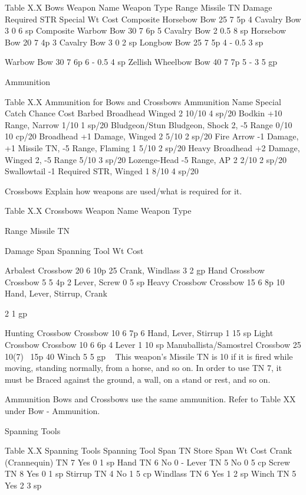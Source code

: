 \documentclass[oneside,11pt,english]{book}
\begin{document}
 
Table X.X Bows 
Weapon Name Weapon Type Range Missile TN Damage Required STR Special Wt Cost 
Composite Horsebow Bow 25 7 5p 4 Cavalry Bow 3 0 6 sp 
Composite Warbow Bow 30 7 6p 5 Cavalry Bow 2 0.5 8 sp 
Horsebow Bow 20 7 4p 3 Cavalry Bow 3 0 2 sp 
Longbow Bow 25 7 5p 4 - 0.5 3 sp 


Warbow Bow 30 7 6p 6 - 0.5 4 sp 
Zellish Wheelbow Bow 40 7 7p 5 - 3 5 gp 

 
Ammunition 

 
Table X.X Ammunition for Bows and Crossbows 
Ammunition Name Special Catch Chance Cost 
Barbed Broadhead Winged 2 10/10 4 sp/20 
Bodkin +10 Range, Narrow 1/10 1 sp/20 
Bludgeon/Stun Bludgeon, Shock 2, -5 Range 0/10 10 cp/20 
Broadhead +1 Damage, Winged 2 5/10 2 sp/20 
Fire Arrow -1 Damage, +1 Missile TN, -5 Range, Flaming 1 5/10 2 sp/20 
Heavy Broadhead +2 Damage, Winged 2, -5 Range 5/10 3 sp/20 
Lozenge-Head -5 Range, AP 2 2/10 2 sp/20 
Swallowtail -1 Required STR, Winged 1 8/10 4 sp/20 

 

Crossbows 
Explain how weapons are used/what is required for it. 

 
Table X.X Crossbows 
Weapon Name Weapon 
Type 

Range Missile 
TN 

Damage Span Spanning Tool Wt Cost 

Arbalest Crossbow 20 6 10p 25 Crank, Windlass 3 2 gp 
Hand Crossbow Crossbow 5 5 4p 2 Lever, Screw 0 5 sp 
Heavy Crossbow Crossbow 15 6 8p 10 Hand, Lever, Stirrup, 
Crank 

2 1 gp 

Hunting Crossbow Crossbow 10 6 7p 6 Hand, Lever, Stirrup 1 15 
sp 
Light Crossbow Crossbow 10 6 6p 4 Lever 1 10 
sp 
Manuballista/Samostrel Crossbow 25 10(7)~ 15p 40 Winch 5 5 gp 
~ This weapon’s Missile TN is 10 if it is fired while moving, standing normally, from a horse, and so on. In order to use TN 7, it 
must be Braced against the ground, a wall, on a stand or rest, and so on. 

 

Ammunition 
Bows and Crossbows use the same ammunition. Refer to Table XX under Bow - Ammunition. 

 


Spanning Tools 

 
Table X.X Spanning Tools 
Spanning Tool Span TN Store Span Wt Cost 
Crank (Crannequin) TN 7 Yes 0 1 sp 
Hand TN 6 No 0 - 
Lever TN 5 No 0 5 cp 
Screw TN 8 Yes 0 1 sp 
Stirrup TN 4 No 1 5 cp 
Windlass TN 6 Yes 1 2 sp 
Winch TN 5 Yes 2 3 sp 
\end{document}
